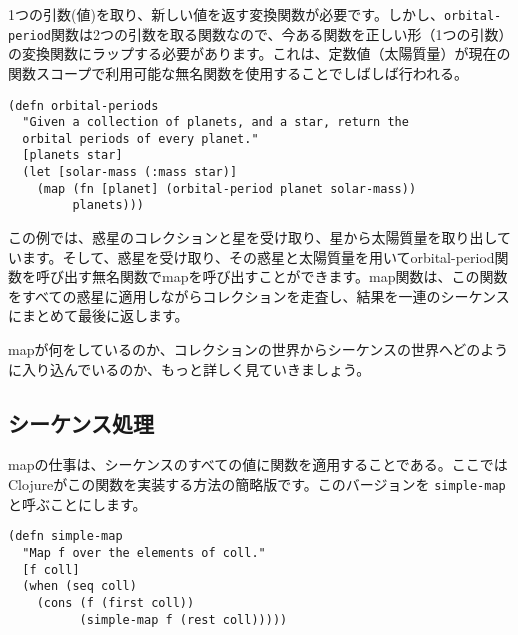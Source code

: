 1つの引数(値)を取り、新しい値を返す変換関数が必要です。しかし、\texttt{orbital-period}関数は2つの引数を取る関数なので、今ある関数を正しい形（1つの引数）の変換関数にラップする必要があります。これは、定数値（太陽質量）が現在の関数スコープで利用可能な無名関数を使用することでしばしば行われる。

\begin{lstlisting}[numbers=none]
(defn orbital-periods
  "Given a collection of planets, and a star, return the
  orbital periods of every planet."
  [planets star]
  (let [solar-mass (:mass star)]
    (map (fn [planet] (orbital-period planet solar-mass))
         planets)))
\end{lstlisting}

この例では、惑星のコレクションと星を受け取り、星から太陽質量を取り出しています。そして、惑星を受け取り、その惑星と太陽質量を用いてorbital-period関数を呼び出す無名関数でmapを呼び出すことができます。map関数は、この関数をすべての惑星に適用しながらコレクションを走査し、結果を一連のシーケンスにまとめて最後に返します。

mapが何をしているのか、コレクションの世界からシーケンスの世界へどのように入り込んでいるのか、もっと詳しく見ていきましょう。


\subsection{シーケンス処理}

 mapの仕事は、シーケンスのすべての値に関数を適用することである。ここでは Clojureがこの関数を実装する方法の簡略版です。このバージョンを \texttt{simple-map} と呼ぶことにします。


\begin{lstlisting}[numbers=none]
(defn simple-map
  "Map f over the elements of coll."
  [f coll]
  (when (seq coll)
    (cons (f (first coll))
          (simple-map f (rest coll)))))
\end{lstlisting}









\begin{lstlisting}[numbers=none]

\end{lstlisting}




